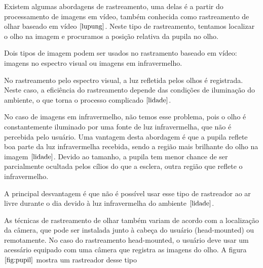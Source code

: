 
Existem algumas abordagens de rastreamento, uma delas é a partir do processamento de imagens em vídeo, também conhecida como rastreamento de olhar baseado em vídeo $\cite{lupung}$. Neste tipo de rastreamento, tentamos localizar o olho na imagem e procuramos a posição relativa da pupila no olho.

Dois tipos de imagem podem ser usados no rastramento baseado em vídeo: imagens no espectro visual ou imagens em infravermelho.

No rastreamento pelo espectro visual, a luz refletida pelos olhos é registrada. Neste caso, a eficiência do rastreamento depende das condições de iluminação do ambiente, o que torna o processo complicado $\cite{lidade}$.

No caso de imagens em infravermelho, não temos esse problema, pois o olho é constantemente iluminado por uma fonte de luz infravermelha, que não é percebida pelo usuário. Uma vantagem desta abordagem é que a pupila reflete boa parte da luz infravermelha recebida, sendo a região mais brilhante do olho na imagem $\cite{lidade}$. Devido ao tamanho, a pupila tem menor chance de ser parcialmente ocultada pelos  cílios do que a esclera, outra região que reflete o infravermelho. %

A principal desvantagem é que não é possível usar esse tipo de rastreador ao ar livre durante o dia devido à luz infravermelha do ambiente $\cite{lidade}$.

As técnicas de rastreamento de olhar também variam de acordo com a localização da câmera, que pode ser instalada junto à cabeça do usuário (head-mounted) ou remotamente. No caso do rastreamento head-mounted, o usuário deve usar um acessário equipado com uma câmera que registra as imagens do olho. A figura $\ref{fig:pupil}$ mostra um rastreador desse tipo


